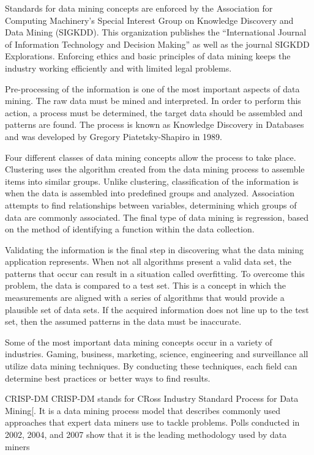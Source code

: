 Standards for data mining concepts are enforced by the Association for Computing Machinery's Special Interest Group on Knowledge Discovery and Data Mining (SIGKDD). This organization publishes the “International Journal of Information Technology and Decision Making” as well as the journal SIGKDD Explorations. Enforcing ethics and basic principles of data mining keeps the industry working efficiently and with limited legal problems.

Pre-processing of the information is one of the most important aspects of data mining. The raw data must be mined and interpreted. In order to perform this action, a process must be determined, the target data should be assembled and patterns are found. The process is known as Knowledge Discovery in Databases and was developed by Gregory Piatetsky-Shapiro in 1989.

Four different classes of data mining concepts allow the process to take place. Clustering uses the algorithm created from the data mining process to assemble items into similar groups. Unlike clustering, classification of the information is when the data is assembled into predefined groups and analyzed. Association attempts to find relationships between variables, determining which groups of data are commonly associated. The final type of data mining is regression, based on the method of identifying a function within the data collection.

Validating the information is the final step in discovering what the data mining application represents. When not all algorithms present a valid data set, the patterns that occur can result in a situation called overfitting. To overcome this problem, the data is compared to a test set. This is a concept in which the measurements are aligned with a series of algorithms that would provide a plausible set of data sets. If the acquired information does not line up to the test set, then the assumed patterns in the data must be inaccurate.

Some of the most important data mining concepts occur in a variety of industries. Gaming, business, marketing, science, engineering and surveillance all utilize data mining techniques. By conducting these techniques, each field can determine best practices or better ways to find results.

CRISP-DM
CRISP-DM stands for CRoss Industry Standard Process for Data Mining[. It is a data mining process model that describes commonly used approaches that expert data miners use to tackle problems. Polls conducted in 2002, 2004, and 2007 show that it is the leading methodology used by data miners


